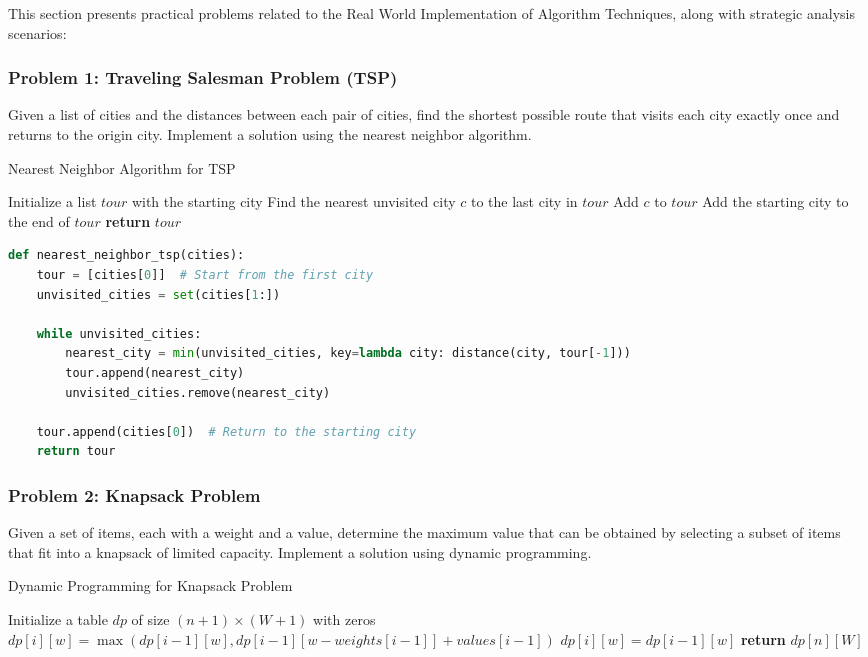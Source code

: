\documentclass[12pt]{book} %
\begin{document}
This section presents practical problems related to the Real World Implementation of Algorithm Techniques, along with strategic analysis scenarios:

\subsubsection*{Problem 1: Traveling Salesman Problem (TSP)}

Given a list of cities and the distances between each pair of cities, find the shortest possible route that visits each city exactly once and returns to the origin city. Implement a solution using the nearest neighbor algorithm.

\begin{algorithm}
\caption{Nearest Neighbor Algorithm for TSP}
\begin{algorithmic}[1]
\State Initialize a list $tour$ with the starting city
\State Find the nearest unvisited city $c$ to the last city in $tour$
\State Add $c$ to $tour$
\EndWhile
\State Add the starting city to the end of $tour$
\State \textbf{return} $tour$
\end{algorithmic}
\end{algorithm}

\FloatBarrier
\begin{lstlisting}[language=Python]
def nearest_neighbor_tsp(cities):
    tour = [cities[0]]  # Start from the first city
    unvisited_cities = set(cities[1:])
    
    while unvisited_cities:
        nearest_city = min(unvisited_cities, key=lambda city: distance(city, tour[-1]))
        tour.append(nearest_city)
        unvisited_cities.remove(nearest_city)
    
    tour.append(cities[0])  # Return to the starting city
    return tour
\end{lstlisting}
\FloatBarrier

\subsubsection*{Problem 2: Knapsack Problem}

Given a set of items, each with a weight and a value, determine the maximum value that can be obtained by selecting a subset of items that fit into a knapsack of limited capacity. Implement a solution using dynamic programming.

\begin{algorithm}
\caption{Dynamic Programming for Knapsack Problem}
\begin{algorithmic}[1]
\State Initialize a table $dp$ of size $(n+1) \times (W+1)$ with zeros
\State $dp[i][w] = \max(dp[i-1][w], dp[i-1][w-weights[i-1]] + values[i-1])$
\Else
\State $dp[i][w] = dp[i-1][w]$
\EndIf
\EndFor
\EndFor
\State \textbf{return} $dp[n][W]$
\end{algorithmic}
\end{algorithm}
\end{document}
